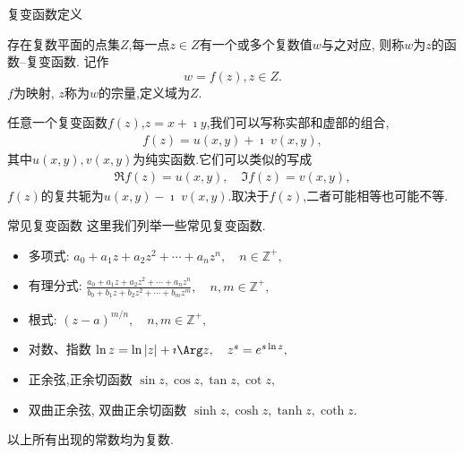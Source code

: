\documentclass[fontset=windows, chinese, 10pt]{beamer}
\begin{document}
  \begin{frame}{复变函数定义}
    \begin{definition}
      存在复数平面的点集$Z$,每一点$z\in Z$有一个或多个复数值$w$与之对应, 则称$w$为$z$的函数--复变函数. 记作
      \begin{equation}
          w = f(z), z\in Z .
      \end{equation}
      $f$为映射, $z$称为$w$的宗量,定义域为$Z$. 
    \end{definition}

任意一个复变函数$f(z)$,$z=x + \imath y$,我们可以写称实部和虚部的组合,
\begin{align}
    f(z) = u(x,y) +\imath \; v(x,y) ,
\end{align}
其中$u(x,y), v(x,y)$为纯实函数.它们可以类似的写成
\begin{align}
    \Re f(z) = u(x,y), \quad \Im f(z) = v(x,y) ,
\end{align}
$f(z)$的复共轭为$u(x,y) - \imath \; v(x,y)$.取决于$f(z)$,二者可能相等也可能不等.

  \end{frame}

  \begin{frame}{常见复变函数}
    这里我们列举一些常见复变函数.

\begin{itemize}
    \item 多项式:
        $
            a_0 + a_1 z + a_2 z^2 + \cdots + a_n z^n , \quad n\in \mathbb{Z}^+ ,
       $
    \item 有理分式:       
         $
        \frac{a_0 + a_1 z + a_2 z^2 + \cdots + a_n z^n}{{b_0 + b_1 z + b_2 z^2 + \cdots + b_m z^m}} , \quad  n,m\in \mathbb{Z}^+ ,
       $
    \item 根式:
        $
            (z-a)^{m/n} , \quad  n,m\in \mathbb{Z}^+ ,
       $
    \item 对数、指数
        $
            \ln z = \ln |z| + \imath \Arg z, \quad z^s = e^{s\ln z} ,
       $
    \item 正余弦,正余切函数 
        $
            \sin z , \cos z , \tan z, \cot z ,
       $
    \item 双曲正余弦, 双曲正余切函数
        $
            \sinh z , \cosh z , \tanh z, \coth z  .
       $
\end{itemize}
以上所有出现的常数均为复数.

\end{frame}
\end{document}
